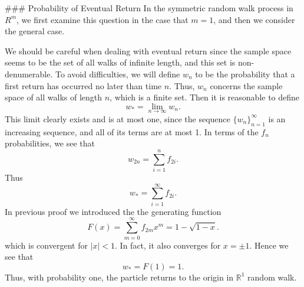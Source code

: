 ### Probability of Eventual Return
In the symmetric random walk process in $R^m$, we first examine this question in the case that $m = 1$, and then we consider the general case.

We should be careful when dealing with eventual return since the sample space seems to be the set of all walks of infinite length, and this set is non-denumerable. To avoid difficulties, we will define $w_n$ to be the probability that a first return has occurred no later than time $n$. Thus,
$w_n$ concerns the sample space of all walks of length $n$, which is a finite set. Then it is reasonable to define 
$$\begin{equation}
    w_{*}=\lim _{n \rightarrow \infty} w_{n}.
\end{equation}$$
This limit clearly exists and is at most one, since the sequence $\{w_n\}_{n=1}^\infty$ is an increasing sequence, and all of its terms are at most 1. In terms of the $f_n$ probabilities, we see that
$$\begin{equation}
    w_{2 n}=\sum_{i=1}^{n} f_{2 i}.
\end{equation}$$
Thus 
$$\begin{equation}
    w_{*}=\sum_{i=1}^{\infty} f_{2 i}.
\end{equation}$$
In previous proof we introduced the the generating function
$$\begin{equation}
    F(x)=\sum_{m=0}^{\infty} f_{2 m} x^{m} = 1-\sqrt{1-x}.
\end{equation}$$
which is convergent for $\left\vert x \right\vert < 1$. In fact, it also converges for $x = \pm 1$. Hence we see that 
$$\begin{equation}
    w_{*}=F(1)=1.
\end{equation}$$
Thus, with probability one, the particle returns to the origin in $\mathbb{R}^1$ random walk.

